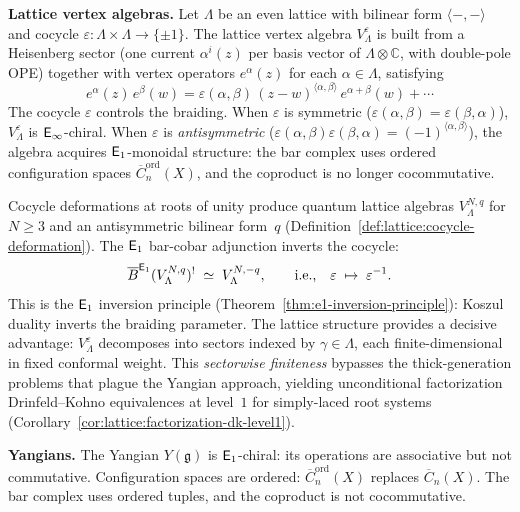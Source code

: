 \medskip
\noindent\textbf{Lattice vertex algebras.}
Let $\Lambda$ be an even lattice with bilinear form
$\langle -,- \rangle$ and cocycle $\varepsilon \colon \Lambda \times
\Lambda \to \{\pm 1\}$.  The lattice vertex algebra
$V_\Lambda^\varepsilon$ is built from a Heisenberg sector (one current
$\alpha^i(z)$ per basis vector of $\Lambda \otimes \mathbb{C}$,
with double-pole OPE) together with vertex operators
$e^\alpha(z)$ for each $\alpha \in \Lambda$, satisfying
\[
e^\alpha(z)\,e^\beta(w) = \varepsilon(\alpha,\beta)\,
(z-w)^{\langle\alpha,\beta\rangle}\, e^{\alpha+\beta}(w)
+ \cdots
\]
The cocycle $\varepsilon$ controls the braiding.  When $\varepsilon$
is symmetric ($\varepsilon(\alpha,\beta) = \varepsilon(\beta,\alpha)$),
$V_\Lambda^\varepsilon$ is $\mathsf{E}_{\infty}$-chiral.  When $\varepsilon$ is
\emph{antisymmetric}
($\varepsilon(\alpha,\beta)\varepsilon(\beta,\alpha) = (-1)^{\langle\alpha,\beta\rangle}$),
the algebra acquires $\mathsf{E}_1$-monoidal structure: the bar complex uses
ordered configuration spaces $\overline{C}_n^{\mathrm{ord}}(X)$, and
the coproduct is no longer cocommutative.

Cocycle deformations at roots of unity produce quantum lattice
algebras $V_\Lambda^{N,q}$ for $N \geq 3$ and an antisymmetric
bilinear form~$q$ (Definition~\ref{def:lattice:cocycle-deformation}).
The $\mathsf{E}_1$ bar-cobar adjunction inverts the cocycle:
\begin{equation}\label{eq:frame-e1-inversion}
\overline{B}^{\mathsf{E}_1}(V_\Lambda^{N,q})^!
\;\simeq\;
V_\Lambda^{N,-q},
\qquad
\text{i.e.,}\quad
\varepsilon \;\mapsto\; \varepsilon^{-1}.
\end{equation}
This is the $\mathsf{E}_1$ inversion principle
(Theorem~\ref{thm:e1-inversion-principle}): Koszul duality inverts
the braiding parameter.  The lattice structure provides a decisive
advantage: $V_\Lambda^\varepsilon$ decomposes into sectors indexed
by $\gamma \in \Lambda$, each finite-dimensional in fixed conformal
weight.  This \emph{sectorwise finiteness} bypasses the
thick-generation problems that plague the Yangian approach, yielding
unconditional factorization Drinfeld--Kohno equivalences at level~$1$
for simply-laced root systems
(Corollary~\ref{cor:lattice:factorization-dk-level1}).

\medskip
\noindent\textbf{Yangians.}
The Yangian $Y(\mathfrak{g})$ is $\mathsf{E}_1$-chiral: its operations are
associative but not commutative.  Configuration spaces are
ordered: $\overline{C}_n^{\mathrm{ord}}(X)$ replaces
$\overline{C}_n(X)$.  The bar complex uses ordered tuples, and
the coproduct is not cocommutative.

